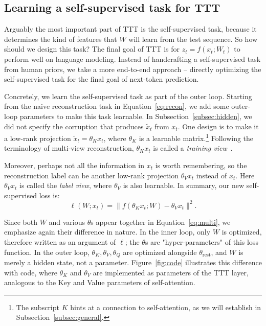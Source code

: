 \documentclass{article}
\begin{document}
\subsection{Learning a self-supervised task for TTT}
\label{subsec:task}
Arguably the most important part of TTT is the self-supervised task, because it determines the kind of features that $W$ will learn from the test sequence.
So how should we design this task?
The final goal of TTT is for $z_t = f(x_t; W_t)$ to perform well on language modeling.
Instead of handcrafting a self-supervised task from human priors, we take a more end-to-end approach -- directly optimizing the self-supervised task for the final goal of next-token prediction.

Concretely, we learn the self-supervised task as part of the outer loop.
Starting from the naive reconstruction task in Equation~\ref{eq:recon}, we add some outer-loop parameters to make this task learnable.
In Subsection~\ref{subsec:hidden}, we did not specify the corruption that produces $\tilde{x}_t$ from $x_t$. One design is to make it a low-rank projection $\tilde{x}_t = \theta_Kx_t$, where $\theta_K$ is a learnable matrix.\footnote{\label{footnote:4}
The subscript $K$ hints at a connection to self-attention, as we will establish in Subsection~\ref{subsec:general}.
}
Following the terminology of multi-view reconstruction, $\theta_Kx_t$ is called a \emph{training view}~\cite{chen2020improved}.

Moreover, perhaps not all the information in $x_t$ is worth remembering, so the reconstruction label can be another low-rank projection $\theta_Vx_t$ instead of $x_t$.
Here $\theta_Vx_t$ is called the \emph{label view}, where $\theta_V$ is also learnable.
In summary, our new self-supervised loss is:
\begin{equation}
\label{eq:multi}
\ell(W; x_t) = \big\| f\left(\theta_K x_t; W\right) - \theta_V x_t \big\|^2.
\end{equation}

Since both $W$ and various $\theta$s appear together in Equation~\ref{eq:multi}, we emphasize again their difference in nature. 
In the inner loop, only $W$ is optimized, therefore written as an argument of $\ell$; the $\theta$s are "hyper-parameters" of this loss function.
In the outer loop, $\theta_K,\theta_V,\theta_Q$ are optimized alongside $\theta_\text{rest}$, and $W$ is merely a hidden state, not a parameter.
Figure~\ref{fig:code} illustrates this difference with code, where $\theta_K$ and $\theta_V$ are implemented as parameters of the TTT layer, 
analogous to the Key and Value parameters of self-attention.
\end{document}

